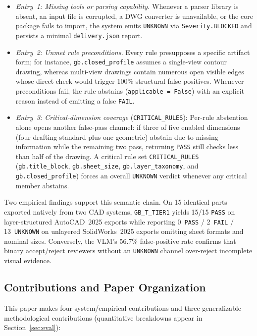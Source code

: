 \documentclass[nocopyright,nolists,upint,varvw,hyphenate]{asmejour}
\begin{document}
\begin{itemize}
\item \emph{Entry~1: Missing tools or parsing capability.} Whenever a parser library is absent, an input file is corrupted, a DWG converter is unavailable, or the core package fails to import, the system emits \texttt{UNKNOWN} via \texttt{Severity.BLOCKED} and persists a minimal \texttt{delivery.json} report.
\item \emph{Entry~2: Unmet rule preconditions.} Every rule presupposes a specific artifact form; for instance, \texttt{gb.closed\_profile} assumes a single-view contour drawing, whereas multi-view drawings contain numerous open visible edges whose direct check would trigger 100\% structural false positives. Whenever preconditions fail, the rule abstains (\texttt{applicable = False}) with an explicit reason instead of emitting a false \texttt{FAIL}.
\item \emph{Entry~3: Critical-dimension coverage} (\texttt{CRITICAL\_RULES}): Per-rule abstention alone opens another false-pass channel: if three of five enabled dimensions (four drafting-standard plus one geometric) abstain due to missing information while the remaining two pass, returning \texttt{PASS} still checks less than half of the drawing. A critical rule set \texttt{CRITICAL\_RULES} (\texttt{gb.title\_block}, \texttt{gb.sheet\_size}, \texttt{gb.layer\_taxonomy}, and \texttt{gb.closed\_profile}) forces an overall \texttt{UNKNOWN} verdict whenever any critical member abstains.
\end{itemize}

Two empirical findings support this semantic chain. On 15 identical parts exported natively from two CAD systems, \texttt{GB\_T\_TIER1} yields 15/15 \texttt{PASS} on layer-structured AutoCAD~2025 exports while reporting 0~\texttt{PASS} / 2~\texttt{FAIL} / 13~\texttt{UNKNOWN} on unlayered SolidWorks~2025 exports omitting sheet formats and nominal sizes. Conversely, the VLM's 56.7\% false-positive rate confirms that binary accept/reject reviewers without an \texttt{UNKNOWN} channel over-reject incomplete visual evidence.

\subsection{Contributions and Paper Organization}

This paper makes four system/empirical contributions and three generalizable methodological contributions (quantitative breakdowns appear in Section~\ref{sec:eval}):
\end{document}
